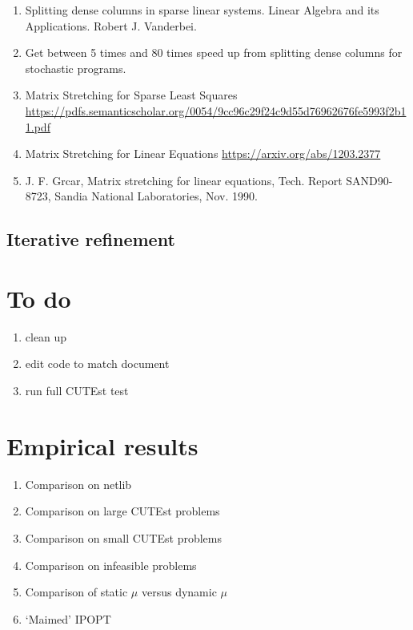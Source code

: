 \documentclass{article}
\begin{document}
\begin{enumerate}
\item Splitting dense columns in sparse linear systems. Linear Algebra and its Applications. Robert J. Vanderbei. \cite{vanderbei1991splitting}
\item \cite{lustig1991formulating} Get between 5 times and 80 times speed up from splitting dense columns for stochastic programs.
\item Matrix Stretching for Sparse Least Squares \url{https://pdfs.semanticscholar.org/0054/9cc96c29f24c9d55d76962676fe5993f2b11.pdf}
\item Matrix Stretching for Linear Equations \url{https://arxiv.org/abs/1203.2377}
\item J. F. Grcar, Matrix stretching for linear equations, Tech. Report SAND90-8723, Sandia
National Laboratories, Nov. 1990.
\end{enumerate}

\subsection{Iterative refinement}


\section{To do}

\begin{enumerate}
\item clean up 
\item edit code to match document
\item run full CUTEst test
\end{enumerate}

\section{Empirical results}\label{sec:empirical-results}

\begin{enumerate}
\item Comparison on netlib
\item Comparison on large CUTEst problems
\item Comparison on small CUTEst problems
\item Comparison on infeasible problems
\item Comparison of static $\mu$ versus dynamic $\mu$
\item `Maimed' IPOPT
\end{enumerate}
\end{document}
